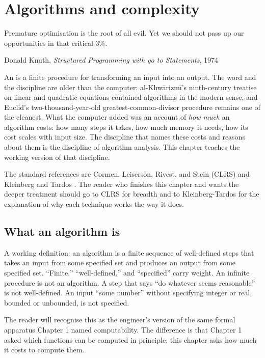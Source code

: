 \chapter{Algorithms and complexity}
\label{vol07:ch03}

\epigraph{Premature optimisation is the root of all evil. Yet we should not pass up our opportunities in that critical 3\%.}{Donald Knuth, \emph{Structured Programming with go to Statements}, 1974}


\noindent
An  is a finite procedure for transforming an input into an output. The word and the discipline are older than the computer: al-Khwārizmī's ninth-century treatise on linear and quadratic equations contained algorithms in the modern sense, and Euclid's two-thousand-year-old greatest-common-divisor procedure remains one of the cleanest. What the computer added was an account of \emph{how much} an algorithm costs: how many steps it takes, how much memory it needs, how its cost scales with input size. The discipline that names these costs and reasons about them is the discipline of algorithm analysis. This chapter teaches the working version of that discipline.

The standard references are Cormen, Leiserson, Rivest, and Stein (CLRS) \cite{text:cormen-clrs} and Kleinberg and Tardos \cite{text:kleinberg-tardos}. The reader who finishes this chapter and wants the deeper treatment should go to CLRS for breadth and to Kleinberg-Tardos for the explanation of why each technique works the way it does.

\section{What an algorithm is}

A working definition: an algorithm is a finite sequence of well-defined steps that takes an input from some specified set and produces an output from some specified set. ``Finite,'' ``well-defined,'' and ``specified'' carry weight. An infinite procedure is not an algorithm. A step that says ``do whatever seems reasonable'' is not well-defined. An input ``some number'' without specifying integer or real, bounded or unbounded, is not specified.

The reader will recognise this as the engineer's version of the same formal apparatus Chapter 1 named computability. The difference is that Chapter 1 asked which functions can be computed in principle; this chapter asks how much it costs to compute them.

